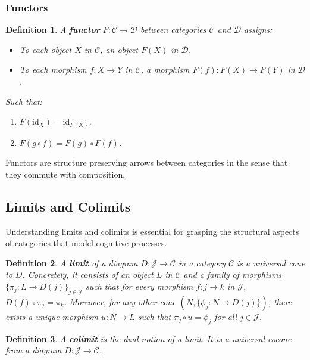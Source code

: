 \documentclass{article}
\newtheorem{definition}{Definition}[section]
\begin{document}
\subsubsection{Functors}

\begin{definition} A \textbf{functor} $F \colon \mathcal{C} \to \mathcal{D}$ between categories $\mathcal{C}$ and $\mathcal{D}$ assigns:

    \begin{itemize} \item To each object $X$ in $\mathcal{C}$, an object $F(X)$ in $\mathcal{D}$. \item To each morphism $f \colon X \to Y$ in $\mathcal{C}$, a morphism $F(f) \colon F(X) \to F(Y)$ in $\mathcal{D}$. \end{itemize}

    Such that:

    \begin{enumerate} \item $F(\text{id}_X) = \text{id}_{F(X)}$. \item $F(g \circ f) = F(g) \circ F(f)$. \end{enumerate} \end{definition}

Functors are structure preserving arrows between categories in the sense that they commute with composition.

\subsection{Limits and Colimits}

Understanding limits and colimits is essential for grasping the structural aspects of categories that model cognitive processes.

\begin{definition}
    A \textbf{limit} of a diagram $D \colon \mathcal{J} \to \mathcal{C}$ in a category $\mathcal{C}$ is a universal cone to $D$. Concretely, it consists of an object $L$ in $\mathcal{C}$ and a family of morphisms $\{\pi_j \colon L \to D(j)\}_{j \in \mathcal{J}}$ such that for every morphism $f \colon j \to k$ in $\mathcal{J}$, $D(f) \circ \pi_j = \pi_k$. Moreover, for any other cone $(N, \{\phi_j \colon N \to D(j)\})$, there exists a unique morphism $u \colon N \to L$ such that $\pi_j \circ u = \phi_j$ for all $j \in \mathcal{J}$.
\end{definition}

\begin{definition}
    A \textbf{colimit} is the dual notion of a limit. It is a universal cocone from a diagram $D \colon \mathcal{J} \to \mathcal{C}$.
\end{definition}
\end{document}
